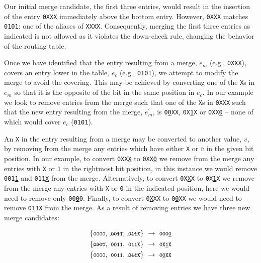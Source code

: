 \documentclass[conference]{IEEEtran}
\newcommand{\mytt}[1]{\texttt{\footnotesize#1}}
\begin{document}
  \noindent Our initial merge candidate, the first three entries, would result in the insertion of the entry \mytt{0XXX} immediately above the bottom entry.
  However, \mytt{0XXX} matches \mytt{0101}: one of the aliases of \mytt{XXXX}.
  Consequently, merging the first three entries as indicated is not allowed as it violates the down-check rule, changing the behavior of the routing table.

  Once we have identified that the entry resulting from a merge, $e_m$ (e.g., \mytt{0XXX}), covers an entry lower in the table, $e_c$ (e.g., \mytt{0101}), we attempt to modify the merge to avoid the covering.
  This may be achieved by converting one of the \mytt{X}s in $e_m$ so that it is the opposite of the bit in the same position in $e_c$.
  In our example we look to remove entries from the merge such that one of the \mytt{X}s in \mytt{0XXX} such that the new entry resulting from the merge, $e_m^\prime$, is \mytt{0\underline{0}XX}, \mytt{0X\underline{1}X} or \mytt{0XX\underline{0}} -- none of which would cover $e_c$ (\mytt{0101}).
  
  An \mytt{X} in the entry resulting from a merge may be converted to another value, $v$, by removing from the merge any entries which have either \mytt{X} or $\overline{v}$ in the given bit position.
  In our example, to convert \mytt{0XX\underline{X}} to \mytt{0XX\underline{0}} we remove from the merge any entries with \mytt{X} or \mytt{1} in the rightmost bit position, in this instance we would remove \mytt{001\underline{1}} and \mytt{011\underline{X}} from the merge.
  Alternatively, to convert \mytt{0X\underline{X}X} to \mytt{0X\underline{1}X} we remove from the merge any entries with \mytt{X} or \mytt{0} in the indicated position, here we would need to remove only \mytt{00\underline{0}0}.
  Finally, to convert \mytt{0\underline{X}XX} to \mytt{0\underline{0}XX} we would need to remove \mytt{0\underline{1}1X} from the merge.
  As a result of removing entries we have three new merge candidates:\nopagebreak
  
  \begin{align*}
    \{\mytt{0000},~\cancel{\mytt{0011}},~\cancel{\mytt{011X}}\} &~\rightarrow~ \mytt{000\underline{0}} \\
    \{\cancel{\mytt{0000}},~\mytt{0011},~\mytt{011X}\}          &~\rightarrow~ \mytt{0X\underline{1}X} \\
    \{\mytt{0000},~\mytt{0011},~\cancel{\mytt{011X}}\}          &~\rightarrow~ \mytt{0\underline{0}XX} \\
  \end{align*}
  
\end{document}
